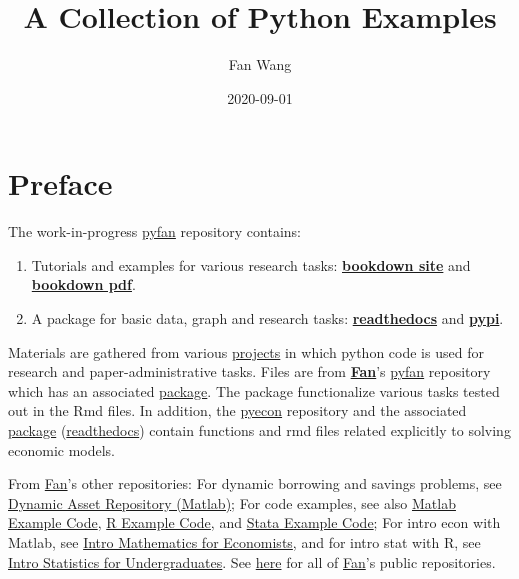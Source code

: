\documentclass[
]{book}
\title{A Collection of Python Examples}
\author{Fan Wang}
\date{2020-09-01}
\providecommand{\tightlist}{%
  \setlength{\itemsep}{0pt}\setlength{\parskip}{0pt}}
\begin{document}
\maketitle

{
\hypersetup{linkcolor=}
\setcounter{tocdepth}{2}
\tableofcontents
}
\hypertarget{preface}{%
\chapter*{Preface}\label{preface}}

The work-in-progress \href{https://github.com/FanWangEcon/pyfan}{pyfan} repository contains:

\begin{enumerate}
\def\labelenumi{\arabic{enumi}.}
\tightlist
\item
  Tutorials and examples for various research tasks: \href{https://fanwangecon.github.io/pyfan/bookdown}{\textbf{bookdown site}} and \href{https://fanwangecon.github.io/pyfan/bookdown/A-Collection-of-Python-Examples.pdf}{\textbf{bookdown pdf}}.
\item
  A package for basic data, graph and research tasks: \href{https://pyfan.readthedocs.io/en/latest/}{\textbf{readthedocs}} and \href{https://pypi.org/project/pyfan/}{\textbf{pypi}}.
\end{enumerate}

Materials are gathered from various \href{https://fanwangecon.github.io/research}{projects} in which python code is used for research and paper-administrative tasks. Files are from \href{https://fanwangecon.github.io/}{\textbf{Fan}}'s \href{https://github.com/FanWangEcon/pyfan}{pyfan} repository which has an associated \href{https://pypi.org/project/pyfan/}{package}. The package functionalize various tasks tested out in the Rmd files. In addition, the \href{https://github.com/FanWangEcon/pyecon}{pyecon} repository and the associated \href{https://pypi.org/project/pyecon/}{package} (\href{https://pyfan.readthedocs.io/en/latest/autoapi/pyfan/index.html\#module-pyfan}{readthedocs}) contain functions and rmd files related explicitly to solving economic models.

From \href{https://fanwangecon.github.io/}{Fan}'s other repositories: For dynamic borrowing and savings problems, see \href{https://fanwangecon.github.io/CodeDynaAsset/}{Dynamic Asset Repository (Matlab)}; For code examples, see also \href{https://fanwangecon.github.io/M4Econ/}{Matlab Example Code}, \href{https://fanwangecon.github.io/R4Econ/}{R Example Code}, and \href{https://fanwangecon.github.io/Stata4Econ/}{Stata Example Code}; For intro econ with Matlab, see \href{https://fanwangecon.github.io/Math4Econ/}{Intro Mathematics for Economists}, and for intro stat with R, see \href{https://fanwangecon.github.io/Stat4Econ/}{Intro Statistics for Undergraduates}. See \href{https://github.com/FanWangEcon}{here} for all of \href{https://fanwangecon.github.io/}{Fan}'s public repositories.
\end{document}
